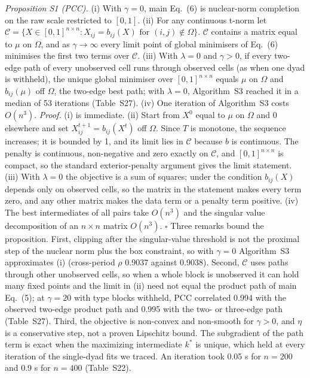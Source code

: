 \documentclass[journal]{IEEEtran}
\begin{document}
\emph{Proposition S1 (PCC).} (i) With $\gamma=0$, main Eq.~(6) is nuclear-norm completion on the raw scale restricted to $[0,1]$. (ii) For any continuous t-norm let $\mathcal C=\{X\in[0,1]^{n\times n}: X_{ij}=b_{ij}(X)\text{ for }(i,j)\notin\Omega\}$. $\mathcal C$ contains a matrix equal to $\mu$ on $\Omega$, and as $\gamma\to\infty$ every limit point of global minimisers of Eq.~(6) minimises the first two terms over $\mathcal C$. (iii) With $\lambda=0$ and $\gamma>0$, if every two-edge path of every unobserved cell runs through observed cells (as when one dyad is withheld), the unique global minimiser over $[0,1]^{n\times n}$ equals $\mu$ on $\Omega$ and $b_{ij}(\mu)$ off $\Omega$, the two-edge best path; with $\lambda=0$, Algorithm~S3 reached it in a median of 53 iterations (Table~S27). (iv) One iteration of Algorithm~S3 costs $O(n^3)$. \emph{Proof.} (i) is immediate. (ii) Start from $X^0$ equal to $\mu$ on $\Omega$ and 0 elsewhere and set $X^{t+1}_{ij}=b_{ij}(X^t)$ off $\Omega$. Since $T$ is monotone, the sequence increases; it is bounded by 1, and its limit lies in $\mathcal C$ because $b$ is continuous. The penalty is continuous, non-negative and zero exactly on $\mathcal C$, and $[0,1]^{n\times n}$ is compact, so the standard exterior-penalty argument gives the limit statement. (iii) With $\lambda=0$ the objective is a sum of squares; under the condition $b_{ij}(X)$ depends only on observed cells, so the matrix in the statement makes every term zero, and any other matrix makes the data term or a penalty term positive. (iv) The best intermediates of all pairs take $O(n^3)$ and the singular value decomposition of an $n\times n$ matrix $O(n^3)$. $\square$ Three remarks bound the proposition. First, clipping after the singular-value threshold is not the proximal step of the nuclear norm plus the box constraint, so with $\gamma=0$ Algorithm~S3 approximates (i) (cross-period $\rho$ 0.9037 against 0.9038). Second, $\mathcal C$ uses paths through other unobserved cells, so when a whole block is unobserved it can hold many fixed points and the limit in (ii) need not equal the product path of main Eq.~(5); at $\gamma=20$ with type blocks withheld, PCC correlated 0.994 with the observed two-edge product path and 0.995 with the two- or three-edge path (Table~S27). Third, the objective is non-convex and non-smooth for $\gamma>0$, and $\eta$ is a conservative step, not a proven Lipschitz bound. The subgradient of the path term is exact when the maximizing intermediate $k^*$ is unique, which held at every iteration of the single-dyad fits we traced. An iteration took 0.05 s for $n=200$ and 0.9 s for $n=400$ (Table~S22).
\end{document}
